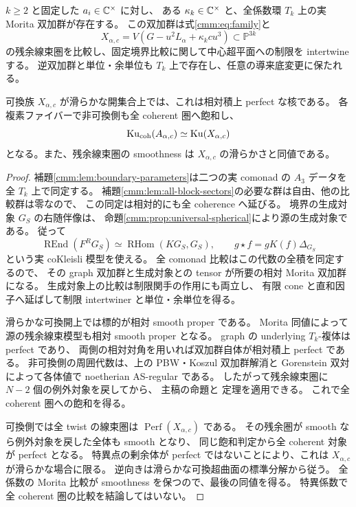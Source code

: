 \begin{theorem}[任意個の同一ブロックの普遍中心比較]
\label{cmm:thm:universal-kernel}
$k\ge2$ と固定した $a_i\in\mathbb C^\times$ に対し、
ある $\kappa_k\in\mathbb C^\times$ と、全係数環 $T_k$ 上の実 Morita 双加群が存在する。
この双加群は式\eqref{cmm:eq:family}と
\begin{equation}\label{cmm:eq:target}
 X_{\alpha,c}=V(G-u^2L_\alpha+\kappa_kcu^3)\subset\mathbb P^{3k}
\end{equation}
の残余線束圏を比較し、固定境界比較に関して中心超平面への制限を intertwine する。
逆双加群と単位・余単位も $T_k$ 上で存在し、任意の導来底変更に保たれる。

可換族 $X_{\alpha,c}$ が滑らかな開集合上では、これは相対積上 perfect な核である。
各複素ファイバーで非可換側も全 coherent 圏へ飽和し、
\[
 \operatorname{Ku}_{\mathrm{coh}}(A_{\alpha,c})\simeq\operatorname{Ku}(X_{\alpha,c})
\]
となる。また、残余線束圏の smoothness は $X_{\alpha,c}$ の滑らかさと同値である。
\end{theorem}

\begin{proof}
補題\ref{cmm:lem:boundary-parameters}は二つの実 comonad の $A_3$ データを
全 $T_k$ 上で同定する。
補題\ref{cmm:lem:all-block-sectors}の必要な群は自由、他の比較群は零なので、
この同定は相対的にも全 coherence へ延びる。
境界の生成対象 $G_S$ の右随伴像は、
命題\ref{cmm:prop:universal-spherical}により源の生成対象である。
従って
\[
 \operatorname{REnd}(F^RG_S)
  \simeq\operatorname{RHom}(KG_S,G_S),\qquad
  g\star f=gK(f)\Delta_{G_S}
\]
という実 coKleisli 模型を使える。
全 comonad 比較はこの代数の全積を同定するので、
その graph 双加群と生成対象との tensor が所要の相対 Morita 双加群になる。
生成対象上の比較は制限関手の作用にも両立し、
有限 cone と直和因子へ延ばして制限 intertwiner と単位・余単位を得る。

滑らかな可換開上では標的が相対 smooth proper である。
Morita 同値によって源の残余線束模型も相対 smooth proper となる。
graph の underlying $T_k$-複体は perfect であり、
両側の相対対角を用いれば双加群自体が相対積上 perfect である。
非可換側の周囲代数は、上の PBW・Koszul 双加群解消と
Gorenstein 双対によって各体値で noetherian AS-regular である。
したがって残余線束圏に $N-2$ 個の例外対象を戻してから、
主稿の命題と
定理を適用できる。
これで全 coherent 圏への飽和を得る。

可換側では全 twist の線束圏は $\operatorname{Perf}(X_{\alpha,c})$ である。
その残余圏が smooth なら例外対象を戻した全体も smooth となり、
同じ飽和判定から全 coherent 対象が perfect となる。
特異点の剰余体が perfect ではないことにより、これは $X_{\alpha,c}$ が滑らかな場合に限る。
逆向きは滑らかな可換超曲面の標準分解から従う。
全係数の Morita 比較が smoothness を保つので、最後の同値を得る。
特異係数で全 coherent 圏の比較を結論してはいない。
\end{proof}

